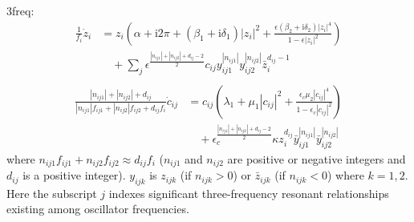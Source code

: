 \documentclass{report}
\begin{document}
\bigskip \bigskip
\noindent 3freq:
\begin{equation*}
\begin{split}
\frac{1}{f_i}\dot{z}_i& = z_i\left(\alpha + \textrm{i}2\pi + \left(\beta_1 + \textrm{i} \delta_1\right)|z_i|^2
+ \frac{\epsilon\left(\beta_2 + \textrm{i} \delta_2\right)|z_i|^4}{1-\epsilon |z_i|^2}\right)\\
& \quad + \displaystyle\sum_{j}\epsilon^\frac{|n_{ij1}|+|n_{ij2}|+d_{ij}-2}{2}
c_{ij}y_{ij1}^{|n_{ij1}|} y_{ij2}^{|n_{ij2}|}\bar{z}_i^{d_{ij}-1}\\
\end{split}
\end{equation*}
\begin{equation*}
\begin{split}
\frac{|n_{ij1}| + |n_{ij2}| + d_{ij}}{|n_{ij1}|f_{ij1} + |n_{ij2}|f_{ij2} + d_{ij}f_i}\dot{c}_{ij}& = c_{ij}\left(\lambda_1 + \mu_1 |c_{ij}|^2 + \frac{\epsilon_c\mu_2 |c_{ij}|^4}{1-\epsilon_c |c_{ij}|^2}\right)\\
& \quad + \epsilon_c^\frac{|n_{ij1}|+|n_{ij2}|+d_{ij}-2}{2}\kappa z_i^{d_{ij}}\bar{y}_{ij1}^{|n_{ij1}|}\bar{y}_{ij2}^{|n_{ij2}|}
\end{split}
\end{equation*}
where $n_{ij1} f_{ij1} + n_{ij2} f_{ij2} \approx d_{ij} f_i$ ($n_{ij1}$ and $n_{ij2}$ are positive or negative integers and $d_{ij}$ is a positive integer). $y_{ijk}$ is $z_{ijk}$ (if $n_{ijk} > 0$) or $\bar{z}_{ijk}$ (if $n_{ijk} < 0$) where $k = 1, 2$. Here the subscript $j$ indexes significant three-frequency resonant relationships existing among oscillator frequencies.
\end{document}

